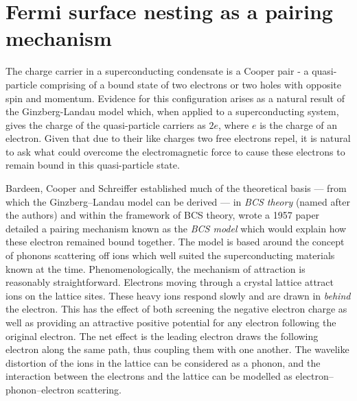 

\section{Fermi surface nesting as a pairing mechanism}

The charge carrier in a superconducting condensate is a Cooper pair - a quasi-particle comprising of a bound state of two electrons or two holes with opposite spin and momentum. Evidence for this configuration arises as a natural result of the Ginzberg-Landau model which, when applied to a superconducting system, gives the charge of the quasi-particle carriers as $2e$, where $e$ is the charge of an electron. Given that due to their like charges two free electrons repel, it is natural to ask what could overcome the electromagnetic force to cause these electrons to remain bound in this quasi-particle state.

Bardeen, Cooper and Schreiffer established much of the theoretical basis --- from which the Ginzberg--Landau model can be derived --- in \textit{BCS theory} (named after the authors) and within the framework of BCS theory, wrote a 1957 paper\cite{Bardeen1957} detailed a pairing mechanism known as the \textit{BCS model} which would explain how these electron remained bound together. The model is based around the concept of phonons scattering off ions which well suited the superconducting materials known at the time. Phenomenologically, the mechanism of attraction is reasonably straightforward. Electrons moving through a crystal lattice attract ions on the lattice sites. These heavy ions respond slowly and are drawn in \textit{behind} the electron. This has the effect of both screening the negative electron charge as well as providing an attractive positive potential for any electron following the original electron. The net effect is the leading electron draws the following electron along the same path, thus coupling them with one another. The wavelike distortion of the ions in the lattice can be considered as a phonon, and the interaction between the electrons and the lattice can be modelled as electron--phonon--electron scattering.

